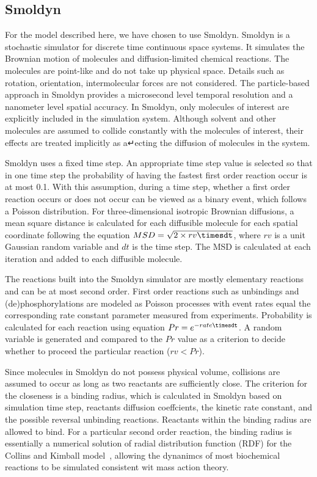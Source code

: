 \subsection{Smoldyn}

For the model described here, we have chosen to use Smoldyn. Smoldyn is a stochastic simulator for discrete time continuous space systems. It simulates the Brownian motion of molecules and diffusion-limited chemical reactions. The molecules are point-like and do not take up physical space. Details such as rotation, orientation, intermolecular forces are not considered. The particle-based approach in Smoldyn provides a microsecond level temporal resolution and a nanometer level spatial accuracy. In Smoldyn, only molecules of interest are explicitly included in the simulation system. Although solvent and other molecules are assumed to collide constantly with the molecules of interest, their effects are treated implicitly as a↵ecting the diffusion of molecules in the system.

Smoldyn uses a fixed time step. An appropriate time step value is selected so that in one time step the probability of having the fastest first order reaction occur is at most 0.1. With this assumption, during a time step, whether a first order reaction occurs or does not occur can be viewed as a binary event, which follows a Poisson distribution. For three-dimensional isotropic Brownian diffusions, a mean square distance is calculated for each diffusible molecule for each spatial coordinate following the equation $MSD = \sqrt{2\times rv\timesdt}$, where $rv$ is a unit Gaussian random variable and $dt$ is the time step. The MSD is calculated at each iteration and added to each diffusible molecule.

The reactions built into the Smoldyn simulator are mostly elementary reactions and can be at most second order. First order reactions such as unbindings and (de)phosphorylations are modeled as Poisson processes with event rates equal the corresponding rate constant parameter measured from experiments. Probability is calculated for each reaction using equation $Pr=e^{-rate\timesdt}$. A random variable is generated and compared to the $Pr$ value as a criterion to decide whether to proceed the particular reaction ($rv<Pr$). 

Since molecules in Smoldyn do not possess physical volume, collisions are assumed to occur as long as two reactants are sufficiently close. The criterion for the closeness is a binding radius, which is calculated in Smoldyn based on simulation time step, reactants diffusion coeffcients, the kinetic rate constant, and the possible reversal unbinding reactions. Reactants within the binding radius are allowed to bind. For a particular second order reaction, the binding radius is essentially a numerical solution of radial distribution function (RDF) for the Collins and Kimball model~\cite{Andrews}, allowing the dynanimcs of most biochemical reactions to be simulated consistent wit mass action theory.

